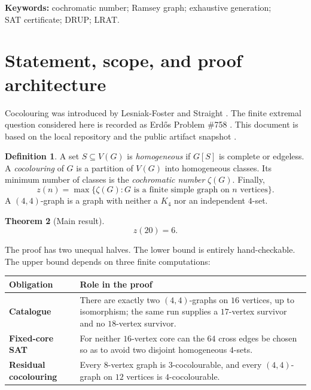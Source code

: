 \documentclass[11pt,a4paper]{article}
\newtheorem{theorem}{Theorem}[section]
\theoremstyle{definition}
\newtheorem{definition}[theorem]{Definition}
\theoremstyle{remark}
\newcommand{\artifact}[1]{\texttt{\detokenize{#1}}}
\begin{document}
\noindent\textbf{Keywords:} cochromatic number; Ramsey graph; exhaustive
generation;\\
SAT certificate; DRUP; LRAT.

\tableofcontents
\newpage

\section{Statement, scope, and proof architecture}

Cocolouring was introduced by Lesniak-Foster and Straight
\cite{lesniak-straight}.  The finite extremal question considered here is
recorded as Erd\H{o}s Problem \#758 \cite{erdos758}.  This document is based
on the local repository \artifact{/Users/admin/z20_repro} and the public
artifact snapshot \cite{z20repo}.

\begin{definition}
A set \(S\subseteq V(G)\) is \emph{homogeneous} if \(G[S]\) is complete or
edgeless.  A \emph{cocolouring} of \(G\) is a partition of \(V(G)\) into
homogeneous classes.  Its minimum number of classes is the
\emph{cochromatic number} \(\zeta(G)\).  Finally,
\[
  z(n)=\max\{\zeta(G):G\text{ is a finite simple graph on }n\text{ vertices}\}.
\]
A \((4,4)\)-graph is a graph with neither a \(K_4\) nor an independent
\(4\)-set.
\end{definition}

\begin{theorem}[Main result]\label{thm:main}
\[
  \boxed{z(20)=6}.
\]
\end{theorem}

The proof has two unequal halves.  The lower bound is entirely
hand-checkable.  The upper bound depends on three finite computations:

\begin{center}
\begin{tabularx}{0.94\textwidth}{@{}>{\bfseries}l X@{}}
\toprule
Obligation & Role in the proof\\
\midrule
Catalogue &
There are exactly two \((4,4)\)-graphs on \(16\) vertices, up to
isomorphism; the same run supplies a \(17\)-vertex survivor and no
\(18\)-vertex survivor.\\
Fixed-core SAT &
For neither \(16\)-vertex core can the \(64\) cross edges be chosen so as
to avoid two disjoint homogeneous \(4\)-sets.\\
Residual cocolouring &
Every \(8\)-vertex graph is \(3\)-cocolourable, and every
\((4,4)\)-graph on \(12\) vertices is \(4\)-cocolourable.\\
\bottomrule
\end{tabularx}
\end{center}
\end{document}
